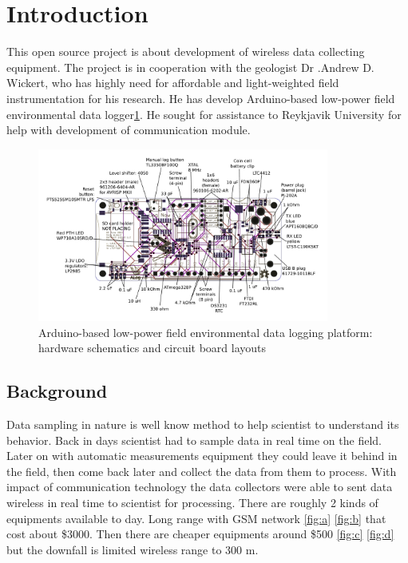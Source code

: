 \section{Introduction}
This open source project is about development of wireless data collecting equipment. The project is in cooperation with the geologist Dr .Andrew D. Wickert\cite{andrewWickert}, who has highly need for affordable and light-weighted field instrumentation for his research. He has develop Arduino-based low-power field environmental data logger\ref{fig:BottleLog}. He sought for assistance to Reykjavik University for help with development of communication module.

\begin{figure}
\centering
\includegraphics[height=5.7cm]{graphics/ALog_drawing.PDF}
\caption{Arduino-based low-power field environmental data logging platform: hardware schematics and circuit board layouts\label{fig:BottleLog}\cite{ALog-BottleLogger}}
\end{figure}

\subsection{Background}
Data sampling in nature is well know method to help scientist to understand its behavior. Back in days scientist had to sample data in real time on the field. Later on with automatic measurements equipment they could leave it behind in the field, then come back later and collect the data from them to process. With impact of communication technology the data collectors were able to sent data wireless in real time to scientist for processing. There are roughly 2 kinds of equipments available to day. Long range with GSM network \ref{fig:a} \ref{fig:b} that cost about \$3000. Then there are cheaper equipments around \$500 \ref{fig:c} \ref{fig:d} but the downfall is limited wireless range to 300 m.

